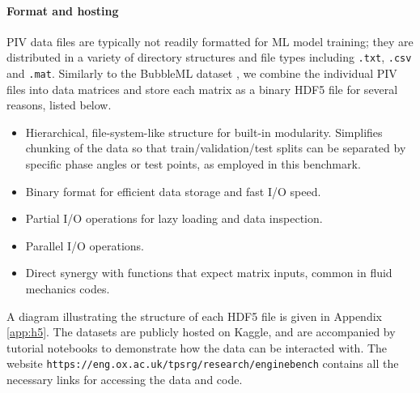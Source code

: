 \documentclass{article}
\begin{document}
\paragraph{Format and hosting}
PIV data files are typically not readily formatted for ML model training; they are distributed in a variety of directory structures and file types including \texttt{.txt}, \texttt{.csv} and \texttt{.mat}. Similarly to the BubbleML dataset \cite{hassan2024bubbleml}, we combine the individual PIV files into data matrices and store each matrix as a binary HDF5 file for several reasons, listed below. 
\begin{itemize}
    \item Hierarchical, file-system-like structure for built-in modularity. Simplifies chunking of the data so that train/validation/test splits can be separated by specific phase angles or test points, as employed in this benchmark.
    \item Binary format for efficient data storage and fast I/O speed.
    \item Partial I/O operations for lazy loading and data inspection.
    \item Parallel I/O operations.
    \item Direct synergy with functions that expect matrix inputs, common in fluid mechanics codes.
\end{itemize}

A diagram illustrating the structure of each HDF5 file is given in Appendix \ref{app:h5}. The datasets are publicly hosted on Kaggle, 
and are accompanied by tutorial notebooks to demonstrate how the data can be interacted with. The website 
\texttt{https://eng.ox.ac.uk/tpsrg/research/enginebench}
contains all the necessary links for accessing the data and code.
\end{document}
